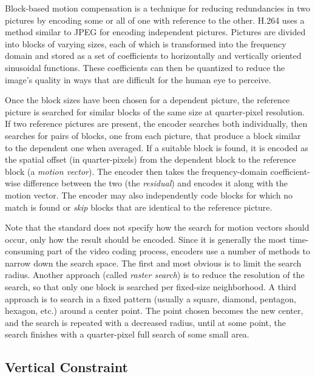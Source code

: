 \documentclass{sig-alternate-05-2015}
\begin{document}
Block-based motion compensation is a technique for reducing redundancies in two
pictures by encoding some or all of one with reference to the other. H.264 uses
a method similar to JPEG for encoding independent pictures. Pictures are divided
into blocks of varying sizes, each of which is transformed into the frequency
domain and stored as a set of coefficients to horizontally and vertically
oriented sinusoidal functions. These coefficients can then be quantized
to reduce the image's quality in ways that are difficult for the human eye to
perceive.

Once the block sizes have been chosen for a dependent picture, the reference
picture is searched for similar blocks of the same size at quarter-pixel
resolution. If two reference pictures are present, the encoder searches both
individually, then searches for pairs of blocks, one from each picture, that
produce a block similar to the dependent one when averaged. If a suitable block
is found, it is encoded as the spatial offset (in quarter-pixels) from the
dependent block to the reference block (a {\it motion vector}). The encoder then
takes the frequency-domain coefficient-wise difference between the two (the
{\it residual}) and encodes it along with the motion vector. The encoder may
also independently code blocks for which no match is found or {\it skip} blocks
that are identical to the reference picture.

Note that the standard does not specify how the search for motion vectors should
occur, only how the result should be encoded. Since it is generally the most
time-consuming part of the video coding process, encoders use a number of
methods to narrow down the search space. The first and most obvious is to limit
the search radius. Another approach (called {\it raster search}) is to reduce
the resolution of the search, so that only one block is searched per fixed-size
neighborhood. A third approach is to search in a fixed pattern (usually a
square, diamond, pentagon, hexagon, etc.) around a center point. The point
chosen becomes the new center, and the search is repeated with a decreased
radius, until at some point, the search finishes with a quarter-pixel full
search of some small area.

\subsection{Vertical Constraint} %
\label{subsec:constraining} %
\end{document}
